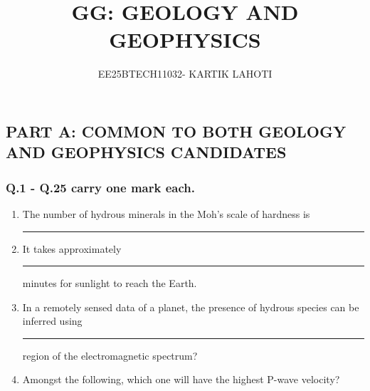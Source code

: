 \documentclass[journal,12pt,onecolumn]{IEEEtran}
\title{GG: GEOLOGY AND GEOPHYSICS}
\author{EE25BTECH11032- KARTIK LAHOTI}
\theoremstyle{remark}
\begin{document}
\maketitle 

\begin{center}
    \subsection*{PART A: COMMON TO BOTH GEOLOGY AND GEOPHYSICS CANDIDATES}
\end{center}
\subsubsection*{Q.1 - Q.25 carry one mark each.}

    \begin{enumerate}
        \item The number of hydrous minerals in the Moh's scale of hardness is \rule{3cm}{0.15mm} \hfill{}

        \item It takes approximately \rule{3cm}{0.15mm} minutes for sunlight to reach the Earth. \hfill{}

        \item In a remotely sensed data of a planet, the presence of hydrous species can be inferred using \rule{3cm}{0.15mm} region of the electromagnetic spectrum? \hfill{}
        \begin{enumerate}
        \end{enumerate}

        \item Amongst the following, which one will have the highest P-wave velocity? \hfill{}
        \begin{enumerate}
        \end{enumerate}


\end{enumerate}
\end{document}
